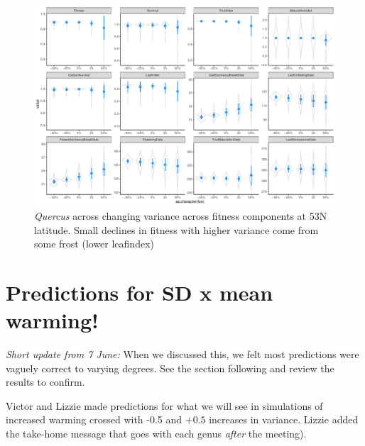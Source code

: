 \documentclass[11pt,letter]{article}
\begin{document}
\begin{figure} 
 \begin{center}
\noindent \includegraphics[width=1\textwidth]{..//analyses/graphs/phenofit/sims/sdsim53_allmetricsQR.pdf}
  \caption{\emph{Quercus} across changing variance across fitness components at 53\degree N latitude. Small declines in fitness with higher variance come from some frost (lower leafindex)}
  \label{fig:quercussd53}
  \end{center}
\end{figure}

\newpage

\section{Predictions for SD x mean warming!}

\emph{Short update from 7 June:} When we discussed this, we felt most predictions were vaguely correct to varying degrees. See the section following and review the results to confirm. 

Victor and Lizzie made predictions for what we will see in simulations of increased warming crossed with -0.5 and $+0.5$ increases in variance. Lizzie added the take-home message that goes with each genus \emph{after} the meeting). 
\end{document}
